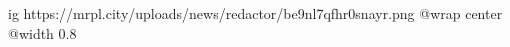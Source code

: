  
 
 
 
 

\ifcmt
  ig https://mrpl.city/uploads/news/redactor/be9nl7qfhr0snayr.png
  @wrap center
  @width 0.8
\fi
